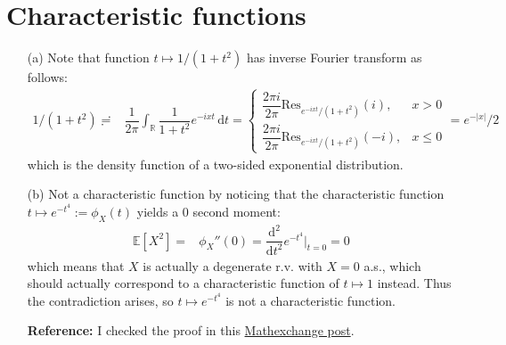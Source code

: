 \documentclass[11pt,a4paper]{article}
\numberwithin{equation}{section}%
\begin{document}
\section{Characteristic functions}

\begin{itemize}[topsep=2pt,itemsep=0pt]
    \item[(a)] Note that function $ t\mapsto 1/(1+t^2) $ has inverse Fourier transform as follows:
    \begin{align*}
        1/(1+t^2)\risingdotseq & \dfrac{ 1 }{ 2\pi } \int _\mathbb{R} \dfrac{ 1 }{ 1+t^2 }e^{-ixt}  \,\mathrm{d}t =\begin{cases}
            \dfrac{ 2\pi i }{ 2\pi } \mathrm{ Res }_{e^{-ixt}/(1+t^2)}(i),& x>0\\
            \dfrac{ 2\pi i }{ 2\pi } \mathrm{ Res }_{e^{-ixt}/(1+t^2)}(-i),& x\leq 0
        \end{cases}= e^{-|x|}/2
    \end{align*}
    which is the density function of a two-sided exponential distribution.
    \item[(b)] Not a characteristic function by noticing that the characteristic function $ t\mapsto e^{-t^4} :=\phi_X(t)$ yields a $ 0 $ second moment:
    \begin{align*}
        \mathbb{E}\left[ X^2 \right] = & \phi_X''(0) = \dfrac{ \mathrm{d}^2 }{ \mathrm{d}t^2 }e^{-t^4}\big|_{t=0}=0
    \end{align*}
    which means that $ X $ is actually a degenerate r.v. with $ X=0 $ a.s., which should actually correspond to a characteristic function of $ t\mapsto 1 $ instead. Thus the contradiction arises, so $ t\mapsto e^{-t^4} $ is not a characteristic function.

    \textbf{Reference:} I checked the proof in this \href{https://math.stackexchange.com/questions/1266578/show-that-exp-t4-is-not-a-characteristic-function?noredirect=1&lq=1}{Mathexchange post}.
    

\end{itemize}
\end{document}

